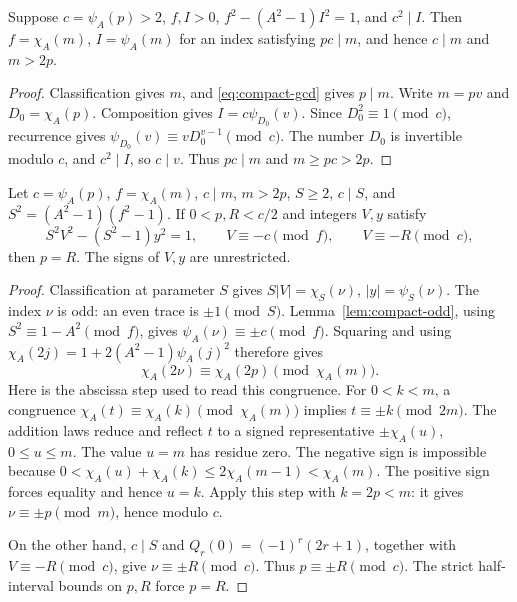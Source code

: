 \begin{lemma}
\label{lem:compact-rank}
Suppose \(c=\psi_A(p)>2\), \(f,I>0\),
\(f^2-(A^2-1)I^2=1\), and \(c^2\mid I\).
Then \(f=\chi_A(m)\), \(I=\psi_A(m)\) for an index satisfying
\(pc\mid m\), and hence \(c\mid m\) and \(m>2p\).
\end{lemma}
\begin{proof}
Classification gives \(m\), and \eqref{eq:compact-gcd} gives \(p\mid m\).
Write \(m=pv\) and \(D_0=\chi_A(p)\).  Composition gives
\(I=c\psi_{D_0}(v)\).  Since \(D_0^2\equiv1\pmod c\), recurrence
gives \(\psi_{D_0}(v)\equiv vD_0^{v-1}\pmod c\).
The number \(D_0\) is invertible modulo \(c\), and \(c^2\mid I\), so
\(c\mid v\).  Thus \(pc\mid m\) and \(m\ge pc>2p\).
\end{proof}

\begin{lemma}
\label{lem:compact-index}
Let \(c=\psi_A(p)\), \(f=\chi_A(m)\), \(c\mid m\), \(m>2p\),
\(S\ge2\), \(c\mid S\), and \(S^2=(A^2-1)(f^2-1)\).
If \(0<p,R<c/2\) and integers \(V,y\) satisfy
\[
 S^2V^2-(S^2-1)y^2=1,\qquad
 V\equiv-c\pmod f,\qquad V\equiv-R\pmod c,
\]
then \(p=R\).  The signs of \(V,y\) are unrestricted.
\end{lemma}
\begin{proof}
Classification at parameter \(S\) gives
\(S|V|=\chi_S(\nu)\), \(|y|=\psi_S(\nu)\).
The index \(\nu\) is odd: an even trace is \(\pm1\pmod S\).
Lemma~\ref{lem:compact-odd}, using
\(S^2\equiv1-A^2\pmod f\), gives
\(\psi_A(\nu)\equiv\pm c\pmod f\).  Squaring and using
\(\chi_A(2j)=1+2(A^2-1)\psi_A(j)^2\) therefore gives
\[
 \chi_A(2\nu)\equiv\chi_A(2p)\pmod{\chi_A(m)}.
\]
Here is the abscissa step used to read this congruence.  For
\(0<k<m\), a congruence
\(\chi_A(t)\equiv\chi_A(k)\pmod{\chi_A(m)}\) implies
\(t\equiv\pm k\pmod{2m}\).  The addition laws reduce and reflect
\(t\) to a signed representative \(\pm\chi_A(u)\), \(0\le u\le m\).
The value \(u=m\) has residue zero.  The negative sign is impossible
because \(0<\chi_A(u)+\chi_A(k)\le2\chi_A(m-1)<\chi_A(m)\).
The positive sign forces equality and hence \(u=k\).
Apply this step with \(k=2p<m\): it gives
\(\nu\equiv\pm p\pmod m\), hence modulo \(c\).

On the other hand, \(c\mid S\) and \(Q_r(0)=(-1)^r(2r+1)\), together
with \(V\equiv-R\pmod c\), give \(\nu\equiv\pm R\pmod c\).
Thus \(p\equiv\pm R\pmod c\).  The strict half-interval bounds on
\(p,R\) force \(p=R\).
\end{proof}

